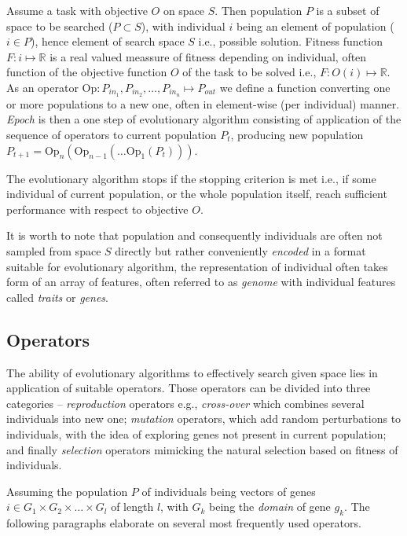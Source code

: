 Assume a task with objective $O$ on space $S$. Then population $P$ is a subset of space to be searched ($P \subset S$), with individual $i$ being an element of population ($i \in P$), hence element of search space $S$ i.e., possible solution. Fitness function $F: i \mapsto \mathbb{R}$ is a real valued meassure of fitness depending on individual, often function of the objective function $O$ of the task to be solved i.e., $F: O(i) \mapsto \mathbb{R}$. As an operator $\text{Op}: P_{in_1}, P_{in_2}, \dots, P_{in_n} \mapsto P_{out}$ we define a function converting one or more populations to a new one, often in element-wise (per individual) manner. \emph{Epoch} is then a one step of evolutionary algorithm consisting of application of the sequence of operators to current population $P_t$, producing new population $P_{t+1} = \text{Op}_n(\text{Op}_{n-1}(\dots \text{Op}_1(P_t)))$.

The evolutionary algorithm stops if the stopping criterion is met i.e., if some individual of current population, or the whole population itself, reach sufficient performance with respect to objective $O$.

It is worth to note that population and consequently individuals are often not sampled from space $S$ directly but rather conveniently \emph{encoded} in a format suitable for evolutionary algorithm, the representation of individual often takes form of an array of features, often referred to as \emph{genome} with individual features called \emph{traits} or \emph{genes}.

\subsection{Operators}
The ability of evolutionary algorithms to effectively search given space lies in application of suitable operators. Those operators can be divided into three categories -- \emph{reproduction} operators e.g., \emph{cross-over} which combines several individuals into new one; \emph{mutation} operators, which add random perturbations to individuals, with the idea of exploring genes not present in current population; and finally \emph{selection} operators mimicking the natural selection based on fitness of individuals.

Assuming the population $P$ of individuals being vectors of genes $i \in G_1 \times G_2 \times \dots \times G_l$ of length $l$, with $G_k$ being the \emph{domain} of gene $g_k$. The following paragraphs elaborate on several most frequently used operators.

